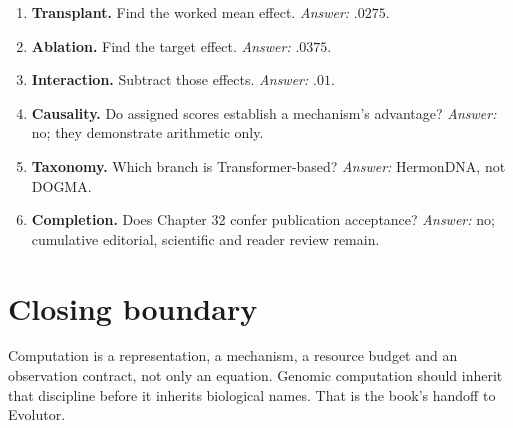 \begin{enumerate}
\emph{Answer:} not without population, inheritance, variation and selection.
\item \textbf{Transplant.} Find the worked mean effect. \emph{Answer:} $.0275$.
\item \textbf{Ablation.} Find the target effect. \emph{Answer:} $.0375$.
\item \textbf{Interaction.} Subtract those effects. \emph{Answer:} $.01$.
\item \textbf{Causality.} Do assigned scores establish a mechanism's advantage?
\emph{Answer:} no; they demonstrate arithmetic only.
\item \textbf{Taxonomy.} Which branch is Transformer-based?
\emph{Answer:} HermonDNA, not DOGMA.
\item \textbf{Completion.} Does Chapter 32 confer publication acceptance?
\emph{Answer:} no; cumulative editorial, scientific and reader review remain.
\end{enumerate}

\section{Closing boundary}
Computation is a representation, a mechanism, a resource budget and an
observation contract, not only an equation. Genomic computation should inherit
that discipline before it inherits biological names. That is the book's
handoff to Evolutor.
